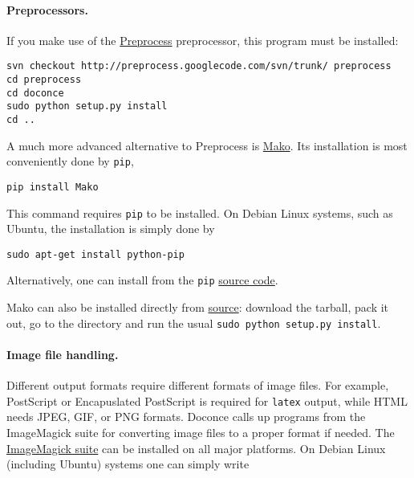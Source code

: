 \documentclass[%
oneside,                 %
final,                   %
10pt]{article}
\begin{document}
\paragraph{Preprocessors.}
If you make use of the \href{{http://code.google.com/p/preprocess}}{Preprocess}
preprocessor, this program must be installed:

\vspace{4pt}
\begin{Verbatim}[numbers=none,frame=lines,fontsize=\fontsize{9pt}{9pt},labelposition=topline,framesep=2.5mm,framerule=0.7pt]
svn checkout http://preprocess.googlecode.com/svn/trunk/ preprocess
cd preprocess
cd doconce
sudo python setup.py install
cd ..
\end{Verbatim}

A much more advanced alternative to Preprocess is
\href{{http://www.makotemplates.org}}{Mako}. Its installation is most
conveniently done by {\fontsize{10pt}{10pt}\Verb!pip!},

\vspace{4pt}
\begin{Verbatim}[numbers=none,frame=lines,fontsize=\fontsize{9pt}{9pt},labelposition=topline,framesep=2.5mm,framerule=0.7pt]
pip install Mako
\end{Verbatim}
This command requires {\fontsize{10pt}{10pt}\Verb!pip!} to be installed. On Debian Linux systems,
such as Ubuntu, the installation is simply done by

\vspace{4pt}
\begin{Verbatim}[numbers=none,frame=lines,fontsize=\fontsize{9pt}{9pt},labelposition=topline,framesep=2.5mm,framerule=0.7pt]
sudo apt-get install python-pip
\end{Verbatim}
Alternatively, one can install from the {\fontsize{10pt}{10pt}\Verb!pip!} \href{{http://pypi.python.org/pypi/pip}}{source code}.

Mako can also be installed directly from
\href{{http://www.makotemplates.org/download.html}}{source}: download the
tarball, pack it out, go to the directory and run
the usual {\fontsize{10pt}{10pt}\Verb!sudo python setup.py install!}.

\paragraph{Image file handling.}
Different output formats require different formats of image files.
For example, PostScript or Encapuslated PostScript is required for {\fontsize{10pt}{10pt}\Verb!latex!}
output, while HTML needs JPEG, GIF, or PNG formats.
Doconce calls up programs from the ImageMagick suite for converting
image files to a proper format if needed. The \href{{http://www.imagemagick.org/script/index.php}}{ImageMagick suite} can be installed on all major platforms.
On Debian Linux (including Ubuntu) systems one can simply write
\end{document}
